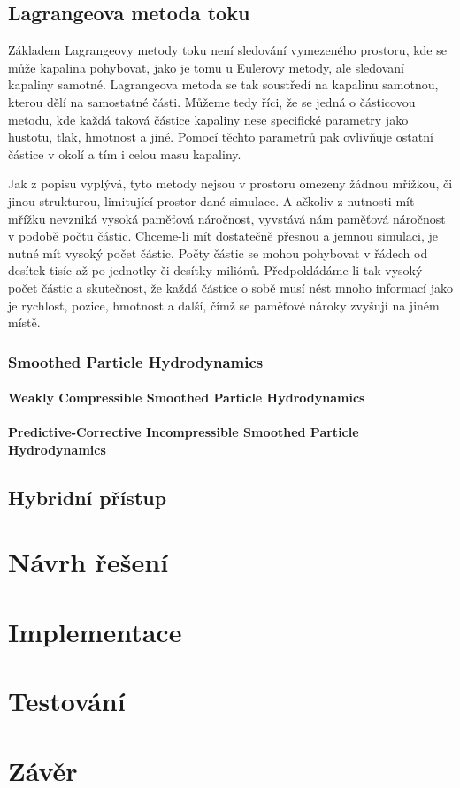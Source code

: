 \section{Lagrangeova metoda toku}
Základem Lagrangeovy metody toku není sledování vymezeného prostoru, kde se může kapalina pohybovat, jako je tomu u Eulerovy metody, ale sledovaní kapaliny samotné. Lagrangeova metoda se tak soustředí na kapalinu samotnou, kterou dělí na samostatné části. Můžeme tedy říci, že se jedná o částicovou metodu, kde každá taková částice kapaliny nese specifické parametry jako hustotu, tlak, hmotnost a jiné. Pomocí těchto parametrů pak ovlivňuje ostatní částice v okolí a tím i celou masu kapaliny.

Jak z popisu vyplývá, tyto metody nejsou v prostoru omezeny žádnou mřížkou, či jinou strukturou, limitující prostor dané simulace. A ačkoliv z nutnosti mít mřížku nevzniká vysoká paměťová náročnost, vyvstává nám paměťová náročnost v podobě počtu částic. Chceme-li mít dostatečně přesnou a jemnou simulaci, je nutné mít vysoký počet částic. Počty částic se mohou pohybovat v řádech od desítek tisíc až po jednotky či desítky miliónů. Předpokládáme-li tak vysoký počet částic a skutečnost, že každá částice o sobě musí nést mnoho informací jako je rychlost, pozice, hmotnost a další, čímž se paměťové nároky zvyšují na jiném místě. 
\subsection{Smoothed Particle Hydrodynamics}

\subsubsection{Weakly Compressible Smoothed Particle Hydrodynamics}
\subsubsection{Predictive-Corrective Incompressible Smoothed Particle Hydrodynamics}
\section{Hybridní přístup}




\chapter{Návrh řešení}
\label{chapter:navrh_resení}

\chapter{Implementace}
\label{chapter:implementace}

\chapter{Testování}
\label{chapter:testovani}

\chapter{Závěr}
\label{chapter:zaver}





